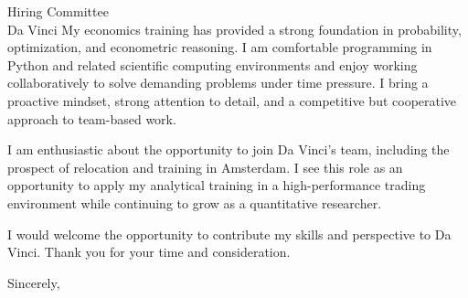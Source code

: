 \documentclass[11pt]{letter}
\begin{document}
\begin{letter}{Hiring Committee \\ Da Vinci}
My economics training has provided a strong foundation in probability, optimization, and econometric reasoning. I am comfortable programming in Python and related scientific computing environments and enjoy working collaboratively to solve demanding problems under time pressure. I bring a proactive mindset, strong attention to detail, and a competitive but cooperative approach to team-based work.

I am enthusiastic about the opportunity to join Da Vinci’s team, including the prospect of relocation and training in Amsterdam. I see this role as an opportunity to apply my analytical training in a high-performance trading environment while continuing to grow as a quantitative researcher.

I would welcome the opportunity to contribute my skills and perspective to Da Vinci. Thank you for your time and consideration.

\closing{Sincerely,}

\end{letter}
\end{document}
